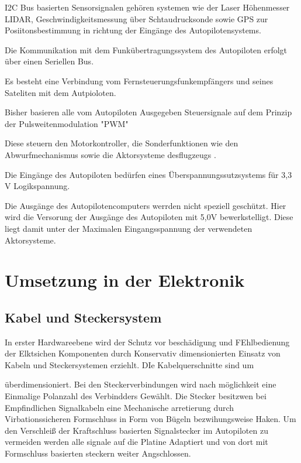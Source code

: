 I2C  Bus basierten Sensorsignalen gehören systemen wie der Laser Höhenmesser LIDAR, Geschwindigkeitsmessung über Schtaudrucksonde sowie GPS zur Posiitonsbestimmung in richtung der Eingänge des Autopilotensystems.

Die Kommunikation mit dem Funkübertragungssystem des Autopiloten erfolgt über einen Seriellen Bus.

Es besteht eine Verbindung vom Fernsteuerungsfunkempfängers und seines Sateliten mit dem Autpioloten.

Bisher basieren alle vom Autopiloten Ausgegeben Steuersignale auf dem Prinzip der Pulsweitenmodulation "PWM"

Diese steuern den Motorkontroller, die Sonderfunktionen wie den Abwurfmechanismus sowie die Aktorsysteme desflugzeugs .


Die Eingänge des Autopiloten bedürfen eines Überspannungssutzsystems für 3,3 V Logikspannung.

Die Ausgänge des Autopilotencomputers werrden nicht speziell geschützt. Hier wird die Versorung der Ausgänge des Autopiloten mit 5,0V bewerkstelligt. Diese liegt damit unter der  Maximalen Eingangsspannung der verwendeten Aktorsysteme.


\section{Umsetzung in der Elektronik}

\subsection{Kabel und Steckersystem}

In erster Hardwareebene  wird der Schutz vor beschädigung und FEhlbedienung der Elktsichen Komponenten durch Konservativ dimensionierten Einsatz von Kabeln und Steckersystemen erziehlt. DIe Kabelquerschnitte sind um
\begin{comment} Prozentzahl ?\end{comment}
überdimensioniert. Bei den Steckerverbindungen wird nach möglichkeit eine Einmalige Polanzahl des Verbindders Gewählt.
Die Stecker besitzwen bei Empfindlichen Signalkabeln eine Mechanische arretierung durch Virbationssicheren Formschluss in Form von Bügeln bezwihungsweise Haken.
Um den Verschleiß der Kraftschluss basierten Signalstecker im Autopiloten zu vermeiden werden alle signale auf die Platine Adaptiert und von dort mit Formschluss basierten steckern weiter  Angschlossen.

